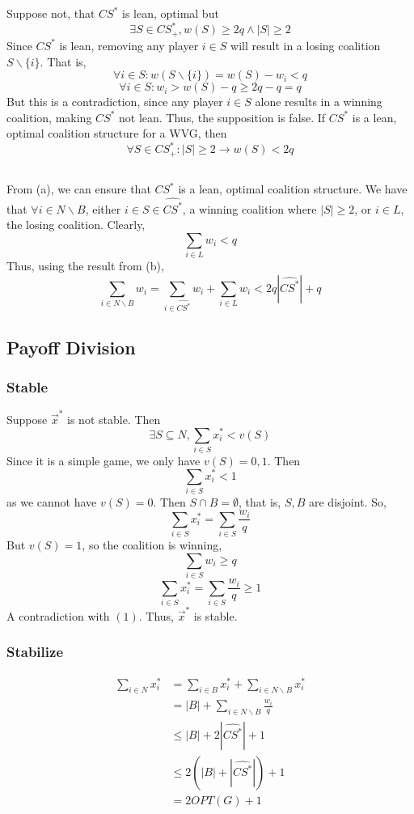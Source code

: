 \subsection{}
Suppose not, that $CS^*$ is lean, optimal but
\[\exists S\in CS_+^*, w(S)\geq 2q \wedge |S| \geq 2\]
Since $CS^*$ is lean, removing any player $i\in S$ will result
in a losing coalition $S\backslash\{i\}$.
That is,
\[\forall i\in S:w(S\backslash\{i\})=w(S)-w_i<q\]
\[\forall i\in S:w_i>w(S)-q\geq 2q-q=q\]
But this is a contradiction, since any player $i\in S$ alone 
results in a winning coalition, making $CS^*$ not lean.
Thus, the supposition is false.
If $CS^*$ is a lean, optimal coalition structure for a WVG, then
\[\forall S\in CS_+^*: |S| \geq 2 \rightarrow w(S) < 2q\]

\subsection{}
From (a), we can ensure that $CS^*$ is a lean, optimal coalition structure.
We have that $\forall i\in N\backslash B$,
either $i\in S\in\widehat{CS^*}$, a winning coalition where $|S|\geq 2$,
or $i\in L$, the losing coalition.
Clearly, 
\[\sum_{i\in L} w_i < q\]
Thus, using the result from (b),
\[\sum_{i\in N\backslash B} w_i
= \sum_{i\in \widehat{CS^*}} w_i + \sum_{i\in L} w_i
< 2q|\widehat{CS^*}| + q\]

\subsection{Payoff Division}

\subsubsection{Stable}
Suppose $\vec{x}^*$ is not stable.
Then 
\begin{equation}
    \exists S\subseteq N, \sum_{i\in S} x_i^* < v(S)
\end{equation}
Since it is a simple game, we only have $v(S)=0,1$.
Then
\[\sum_{i\in S} x_i^* < 1\]
as we cannot have $v(S)=0$.
Then $S\cap B=\emptyset$, that is, $S,B$ are disjoint.
So,
\[\sum_{i\in S} x_i^* = \sum_{i\in S} \frac{w_i}{q}\]
But $v(S)=1$, so the coalition is winning,
\[\sum_{i\in S} w_i \geq q\]
\[\sum_{i\in S} x_i^* = \sum_{i\in S} \frac{w_i}{q} \geq 1\]
A contradiction with $(1)$. 
Thus, $\vec{x}^*$ is stable.

\subsubsection{Stabilize}
\begin{equation}
\begin{aligned}
    \sum_{i\in N} x_i^* 
    &= \sum_{i\in B} x_i^* + \sum_{i\in N\backslash B} x_i^*\\
    &= |B|+\sum_{i\in N\backslash B} \frac{w_i}{q}\\
    &\leq |B|+2|\widehat{CS^*}| + 1\\
    &\leq 2(|B|+|\widehat{CS^*}|) + 1\\
    &= 2OPT(G) + 1
\end{aligned}
\end{equation}


